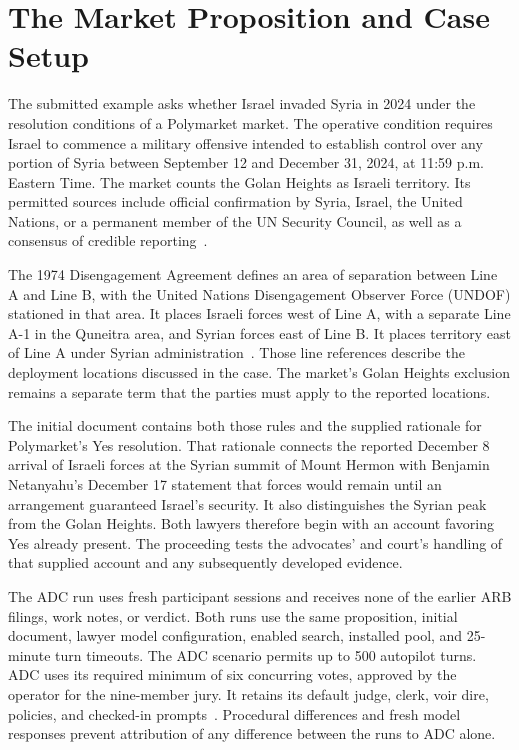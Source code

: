 \documentclass[11pt]{article}
\begin{document}
\section{The Market Proposition and Case Setup}

The submitted example asks whether Israel invaded Syria in 2024 under the resolution conditions of a Polymarket market.  The operative condition requires Israel to commence a military offensive intended to establish control over any portion of Syria between September 12 and December 31, 2024, at 11:59 p.m. Eastern Time.  The market counts the Golan Heights as Israeli territory.  Its permitted sources include official confirmation by Syria, Israel, the United Nations, or a permanent member of the UN Security Council, as well as a consensus of credible reporting~\cite{example}.

The 1974 Disengagement Agreement defines an area of separation between Line A and Line B, with the United Nations Disengagement Observer Force (UNDOF) stationed in that area.  It places Israeli forces west of Line A, with a separate Line A-1 in the Quneitra area, and Syrian forces east of Line B.  It places territory east of Line A under Syrian administration~\cite{disengagement}.  Those line references describe the deployment locations discussed in the case.  The market's Golan Heights exclusion remains a separate term that the parties must apply to the reported locations.

The initial document contains both those rules and the supplied rationale for Polymarket's Yes resolution.  That rationale connects the reported December 8 arrival of Israeli forces at the Syrian summit of Mount Hermon with Benjamin Netanyahu's December 17 statement that forces would remain until an arrangement guaranteed Israel's security.  It also distinguishes the Syrian peak from the Golan Heights.  Both lawyers therefore begin with an account favoring Yes already present.  The proceeding tests the advocates' and court's handling of that supplied account and any subsequently developed evidence.

The ADC run uses fresh participant sessions and receives none of the earlier ARB filings, work notes, or verdict.  Both runs use the same proposition, initial document, lawyer model configuration, enabled search, installed pool, and 25-minute turn timeouts.  The ADC scenario permits up to 500 autopilot turns.  ADC uses its required minimum of six concurring votes, approved by the operator for the nine-member jury.  It retains its default judge, clerk, voir dire, policies, and checked-in prompts~\cite[input settings and generated scenario]{record}.  Procedural differences and fresh model responses prevent attribution of any difference between the runs to ADC alone.
\end{document}
